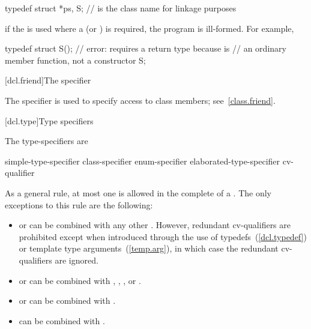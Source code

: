 \begin{codeblock}
typedef struct { } *ps, S;      //  is the class name for linkage purposes
\end{codeblock}

\exitexampleb
\enternote
if the  is used where a 
(or ) is required, the program is ill-formed.
For example,

\begin{codeblock}
typedef struct {
    S();			// error: requires a return type because  is
				// an ordinary member function, not a constructor
} S;
\end{codeblock}
\exitnoteb

[dcl.friend]{The  specifier}%

\pnum
The  specifier is used to specify access to class members;
see~\ref{class.friend}.

[dcl.type]{Type specifiers}%

\pnum
The type-specifiers are

%
%
%
\begin{bnf}
\br
    simple-type-specifier\br
    class-specifier\br
    enum-specifier\br
    elaborated-type-specifier\br
    cv-qualifier
\end{bnf}

As a general rule, at most one  is allowed in
the complete  of a .
The only exceptions to this rule are the following:

\begin{itemize}
\item {} or  can be combined with any other
. However, redundant cv-qualifiers are
prohibited except when introduced through the use of
typedefs~(\ref{dcl.typedef}) or template type arguments~(\ref{temp.arg}),
in which case the redundant cv-qualifiers are ignored.

\item {} or  can be combined with
, , , or .

\item {} or  can be combined with .

\item {} can be combined with .
\end{itemize}

